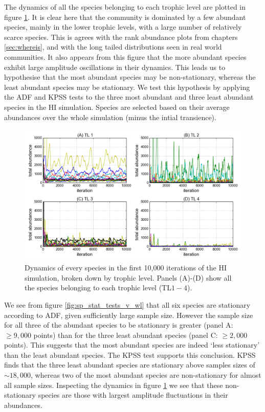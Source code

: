 The dynamics of all the species belonging to each trophic level are plotted in figure \ref{fig:dynamics_by_species}. It is clear here that the community is dominated by a few abundant species, mainly in the lower trophic levels, with a large number of relatively scarce species. This is agrees with the rank abundance plots from chapters \ref{sec:whereis}, and with the long tailed distributions seen in real world communities. It also appears from this figure that the more abundant species exhibit large amplitude oscillations in their dynamics. This leads us to hypothesise that the most abundant species may be non-stationary, whereas the least abundant species may be stationary. We test this hypothesis by applying the ADF and KPSS tests to the three most abundant and three least abundant species in the HI simulation. Species are selected based on their average abundances over the whole simulation (minus the intial transience).  

\begin{figure}[ht!]
	\centering
	\includegraphics[width=1.0\linewidth]{"./chapters/chapter04b/figures/hi_sp_by_tl_part10000"}
    \caption{Dynamics of every species in the first 10,000 iterations of the HI simulation, broken down by trophic level. Panels (A)-(D) show all the species belonging to each trophic level (TL$1-4$).}    
    \label{fig:dynamics_by_species}
\end{figure}

We see from figure \ref{fig:sp_stat_tests_v_wl} that all six species are stationary according to ADF, given sufficiently large sample size. However the sample size for all three of the abundant species to be stationary is greater (panel A: $\geq 9,000$ points) than for the three least abundant species (panel C: $\geq 2,000$ points). This suggests that the most abundant species are indeed `less stationary' than the least abundant species. The KPSS test supports this conclusion. KPSS finds that the three least abundant species are stationary above samples sizes of $\sim 18,000$, whereas two of the most abundant species are non-stationary for almost all sample sizes. Inspecting the dynamics in figure \ref{fig:dynamics_by_species} we see that these non-stationary species are those with largest amplitude fluctuations in their abundances. 

